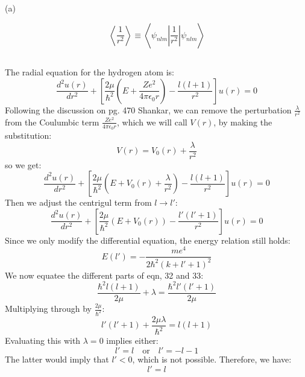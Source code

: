 \documentclass[12pt]{article}
\begin{document}
(a)

$$
\left\langle\frac{1}{r^{2}}\right\rangle \equiv\left\langle\psi_{n l m}\left|\frac{1}{r^{2}}\right| \psi_{n l m}\right\rangle
$$
\subsection{}
The radial equation for the hydrogen atom is:
\begin{equation}
  \frac{d^2u(r)}{dr^2} + \left[ \frac{2\mu}{\hbar^2}\left( E + \frac{Ze^2}{4\pi\epsilon_0r} \right) - \frac{l(l+1)}{r^2} \right] u(r) = 0
\end{equation}
Following the discussion on pg. 470 Shankar, we can remove the perturbation $\frac{\lambda}{r^2}$ from the Coulumbic term $\frac{Ze^2}{4\pi\epsilon_0r}$, which we will call $V(r)$, by making the substitution:
\begin{equation}
  V(r) = V_0(r) + \frac{\lambda}{r^2}
\end{equation}
so we get:
\begin{equation}
  \frac{d^2u(r)}{dr^2} + \left[ \frac{2\mu}{\hbar^2}\left( E + V_0(r) + \frac{\lambda}{r^2} \right) - \frac{l(l+1)}{r^2} \right] u(r) = 0
\end{equation}
Then we adjust the centrigul term from $l\rightarrow l'$:
\begin{equation}
  \frac{d^2u(r)}{dr^2} + \left[ \frac{2\mu}{\hbar^2}\left( E + V_0(r) \right) - \frac{l'(l'+1)}{r^2} \right] u(r) = 0
\end{equation}
Since we only modify the differential equation, the energy relation still holds:
\begin{equation}
  E(l')= - \frac{me^4}{2\hbar^2(k+l'+1)^2}
\end{equation}
We now equatee the different parts of eqn, 32 and 33:
\begin{equation}
  \frac{\hbar^2l(l+1)}{2\mu} + \lambda = \frac{\hbar^2l'(l'+1)}{2\mu}
\end{equation}
Multiplying through by $\frac{2\mu}{\hbar^2}$:
\begin{equation}
  l'(l'+1) + \frac{2\mu\lambda}{\hbar^2} = l(l+1)
\end{equation}
Evaluating this with $\lambda = 0$ implies either:
\begin{equation}
  l' = l \quad \text{or} \quad l' = -l - 1
\end{equation}
The latter would imply that $l' < 0$, which is not possible. Therefore, we have:
\begin{equation}
  l' = l
\end{equation}
\end{document}
